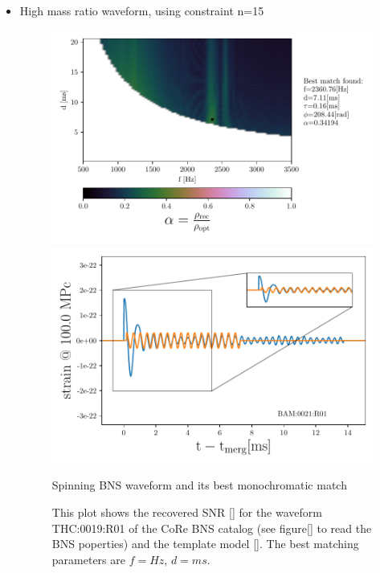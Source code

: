 \begin{itemize}[leftmargin=*]


\item High mass ratio waveform, using constraint n=15

\begin{figure}[!htbp]
\begin{center}
\begin{minipage}[t]{0.5\linewidth}
\vspace{0pt}
\includegraphics[scale=0.6,trim={2mm 0 35mm 0},clip]{images/Data_analysis/results/2D_grid_13.pdf}
\end{minipage}%
\begin{minipage}[t]{0.5\linewidth}
\vspace{20pt}
\includegraphics[scale=0.45]{images/Data_analysis/results/2D_grid_14.pdf}
\end{minipage}
\captionsetup{width=0.8\textwidth}
\caption{Spinning BNS waveform and its best monochromatic match}
\caption*{This plot shows the recovered SNR \ref{} for the waveform THC:0019:R01 of the CoRe BNS catalog \cite{}(see figure\ref{} to read the BNS poperties) and the template model \ref{}. The best matching parameters are $f=Hz$, $d=ms$.}
\end{center}
\end{figure}


\end{itemize}
